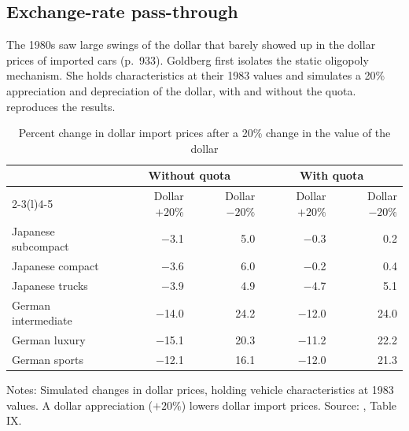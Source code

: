 \subsection{Exchange-rate pass-through}\label{sec:08-goldberg-passthrough}

The 1980s saw large swings of the dollar that barely showed up in the dollar prices of imported cars (p.~933).
Goldberg first isolates the static oligopoly mechanism. She holds characteristics at their 1983 values and
simulates a 20\% appreciation and depreciation of the dollar, with and without the quota. 
reproduces the results.

\begin{table}[htbp]
\centering
\caption{Percent change in dollar import prices after a 20\% change in the value of the dollar}
\label{tab:08-gold-pass}
\footnotesize
\begin{tabular}{@{}lrrrr@{}}
\toprule
 & \multicolumn{2}{c}{Without quota} & \multicolumn{2}{c}{With quota} \\
\cmidrule(lr){2-3}\cmidrule(l){4-5}
 & Dollar $+20\%$ & Dollar $-20\%$ & Dollar $+20\%$ & Dollar $-20\%$ \\
\midrule
Japanese subcompact & $-$3.1 & 5.0 & $-$0.3 & 0.2 \\
Japanese compact & $-$3.6 & 6.0 & $-$0.2 & 0.4 \\
Japanese trucks & $-$3.9 & 4.9 & $-$4.7 & 5.1 \\
German intermediate & $-$14.0 & 24.2 & $-$12.0 & 24.0 \\
German luxury & $-$15.1 & 20.3 & $-$11.2 & 22.2 \\
German sports & $-$12.1 & 16.1 & $-$12.0 & 21.3 \\
\bottomrule
\end{tabular}

\smallskip
\begin{minipage}{0.86\linewidth}
\footnotesize Notes: Simulated changes in dollar prices, holding vehicle characteristics at 1983 values. A
dollar appreciation ($+20\%$) lowers dollar import prices. Source: \citet{Goldberg1995}, Table IX.
\end{minipage}
\end{table}


